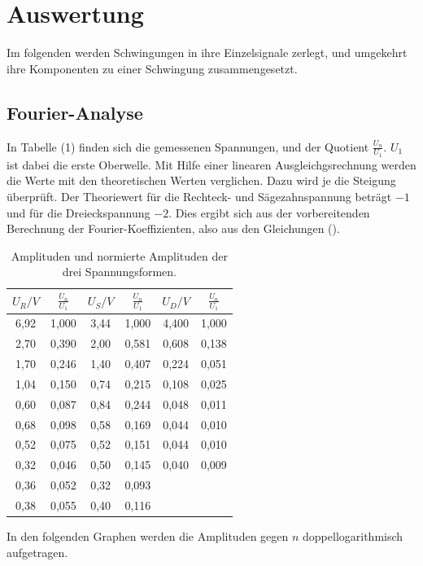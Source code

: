 \section{Auswertung}
\label{sec:Auswertung}

Im folgenden werden Schwingungen in ihre Einzelsignale zerlegt, und umgekehrt ihre Komponenten zu einer Schwingung zusammengesetzt.

\subsection{Fourier-Analyse}
In Tabelle (1) finden sich die gemessenen Spannungen, und der Quotient $\frac{U_n}{U_1}$. $U_1$ ist dabei die erste Oberwelle. Mit Hilfe einer linearen Ausgleichgsrechnung werden die Werte mit den theoretischen
Werten verglichen. Dazu wird je die Steigung überprüft. Der Theoriewert für die Rechteck- und Sägezahnspannung beträgt $-1$ und für
die Dreieckspannung $-2$. Dies ergibt sich aus der vorbereitenden Berechnung der Fourier-Koeffizienten, also aus den Gleichungen ().


\begin{table}[H]
  \centering
  \caption{Amplituden und normierte Amplituden der drei Spannungsformen.}
  \label{tab:Rechteckspannung}
  \begin{tabular}{c c | c c | c c}
    \toprule
    $U_R/V$ & $\frac{U_n}{U_1}$ & $U_S/V$ & $\frac{U_n}{U_1}$ & $U_D/V$ & $\frac{U_n}{U_1}$ \\
    \midrule
    6,92 & 1,000 & 3,44 & 1,000 & 4,400 &  1,000\\
    2,70 & 0,390 & 2,00 & 0,581 & 0,608 &  0,138\\
    1,70 & 0,246 & 1,40 & 0,407 & 0,224 &  0,051\\
    1,04 & 0,150 & 0,74 & 0,215 & 0,108 &  0,025\\
    0,60 & 0,087 & 0,84 & 0,244 & 0,048 &  0,011\\
    0,68 & 0,098 & 0,58 & 0,169 & 0,044 &  0,010\\
    0,52 & 0,075& 0,52 & 0,151 & 0,044 &  0,010\\
    0,32 & 0,046 & 0,50 & 0,145 & 0,040 &  0,009\\
    0,36 & 0,052& 0,32 & 0,093 \\
    0,38 & 0,055& 0,40 & 0,116 \\
    \bottomrule
  \end{tabular}
\end{table}

\noindent In den folgenden Graphen werden die Amplituden gegen $n$ doppellogarithmisch aufgetragen.

